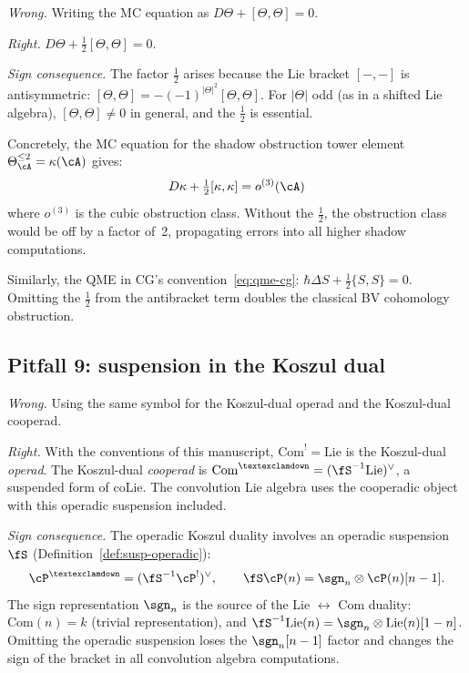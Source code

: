 \emph{Wrong.} Writing the MC equation as $D\Theta + [\Theta, \Theta] = 0$.

\emph{Right.} $D\Theta + \frac{1}{2}[\Theta, \Theta] = 0$.

\emph{Sign consequence.} The factor $\frac{1}{2}$ arises because the
Lie bracket $[-,-]$ is antisymmetric: $[\Theta, \Theta] = -(-1)^{|\Theta|^2}[\Theta, \Theta]$.
For $|\Theta|$ odd (as in a shifted Lie algebra), $[\Theta,\Theta] \neq 0$
in general, and the $\frac{1}{2}$ is essential.

Concretely, the MC equation for the shadow obstruction tower element $\Theta_\cA^{\leq 2} = \kappa(\cA)$ gives:
\[
D\kappa + \tfrac{1}{2}[\kappa, \kappa] = o^{(3)}(\cA)
\]
where $o^{(3)}$ is the cubic obstruction class. Without the $\frac{1}{2}$,
the obstruction class would be off by a factor of~2, propagating errors
into all higher shadow computations.

Similarly, the QME in CG's convention~\eqref{eq:qme-cg}:
$\hbar\Delta S + \frac{1}{2}\{S,S\} = 0$. Omitting the $\frac{1}{2}$
from the antibracket term doubles the classical BV cohomology obstruction.

\subsection{Pitfall 9: suspension in the Koszul dual}

\emph{Wrong.} Using the same symbol for the Koszul-dual operad and
the Koszul-dual cooperad.

\emph{Right.} With the conventions of this manuscript,
$\mathrm{Com}^! = \mathrm{Lie}$ is the Koszul-dual \emph{operad}.
The Koszul-dual \emph{cooperad} is
$\mathrm{Com}^{\scriptstyle \textexclamdown}
 = (\fS^{-1}\mathrm{Lie})^\vee$, a suspended form of $\mathrm{coLie}$.
The convolution Lie algebra uses the cooperadic object with this
operadic suspension included.

\emph{Sign consequence.} The operadic Koszul duality involves an operadic
suspension $\fS$ (Definition~\ref{def:susp-operadic}):
\[
\cP^{\scriptstyle \text{\textexclamdown}} = (\fS^{-1}\cP^!)^\vee, \qquad
\fS\cP(n) = \sgn_n \otimes \cP(n)[n-1].
\]
The sign representation $\sgn_n$ is the source of the
Lie $\leftrightarrow$ Com duality: $\mathrm{Com}(n) = k$ (trivial representation),
and $\fS^{-1}\mathrm{Lie}(n) = \sgn_n \otimes \mathrm{Lie}(n)[1-n]$.
Omitting the operadic suspension loses the $\sgn_n[n-1]$ factor and
changes the sign of the bracket in all convolution algebra computations.


